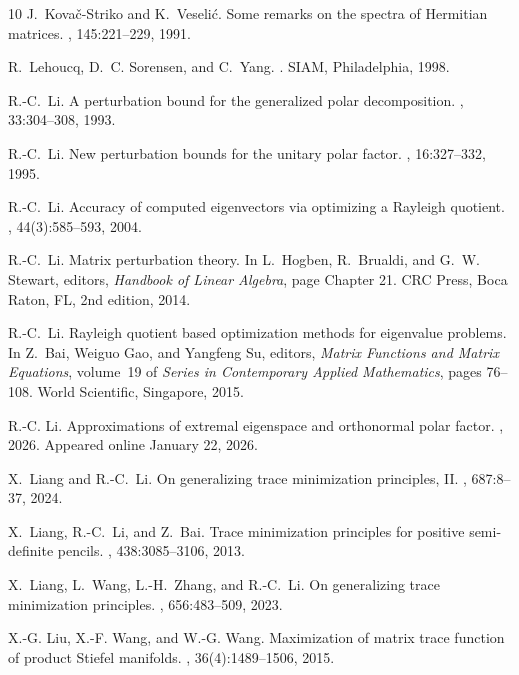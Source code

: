 \documentclass[11pt]{article}
\theoremstyle{definition}
\numberwithin{equation}{section}
\begin{document}
{\begin{thebibliography}{10}
J.~Kova{\v c}-Striko and K.~Veseli{\' c}.
\newblock Some remarks on the spectra of {Hermitian} matrices.
, 145:221--229, 1991.

R.~Lehoucq, D.~C. Sorensen, and C.~Yang.
.
\newblock SIAM, Philadelphia, 1998.

R.-C.~Li.
\newblock A perturbation bound for the generalized polar decomposition.
, 33:304--308, 1993.

R.-C.~Li.
\newblock New perturbation bounds for the unitary polar factor.
, 16:327--332, 1995.

R.-C.~Li.
\newblock Accuracy of computed eigenvectors via optimizing a {Rayleigh}
  quotient.
, 44(3):585--593, 2004.

R.-C.~Li.
\newblock Matrix perturbation theory.
\newblock In L.~Hogben, R.~Brualdi, and G.~W. Stewart, editors, {\em Handbook
  of Linear Algebra}, page Chapter 21. CRC Press, Boca Raton, FL, 2nd edition,
  2014.

R.-C.~Li.
\newblock Rayleigh quotient based optimization methods for eigenvalue problems.
\newblock In Z.~Bai, Weiguo Gao, and Yangfeng Su, editors, {\em Matrix
  Functions and Matrix Equations}, volume~19 of {\em Series in Contemporary
  Applied Mathematics}, pages 76--108. World Scientific, Singapore, 2015.

R.-C. Li.
\newblock Approximations of extremal eigenspace and orthonormal polar factor.
, 2026.
\newblock Appeared online January 22, 2026.

X.~Liang and R.-C.~Li.
\newblock On generalizing trace minimization principles, {II}.
, 687:8--37, 2024.

X.~Liang, R.-C.~Li, and Z.~Bai.
\newblock Trace minimization principles for positive semi-definite pencils.
, 438:3085--3106, 2013.

X.~Liang, L.~Wang, L.-H.~Zhang, and R.-C.~Li.
\newblock On generalizing trace minimization principles.
, 656:483--509, 2023.

X.-G. Liu, X.-F. Wang, and W.-G. Wang.
\newblock Maximization of matrix trace function of product {S}tiefel manifolds.
, 36(4):1489--1506, 2015.


\end{thebibliography}}
\end{document}

